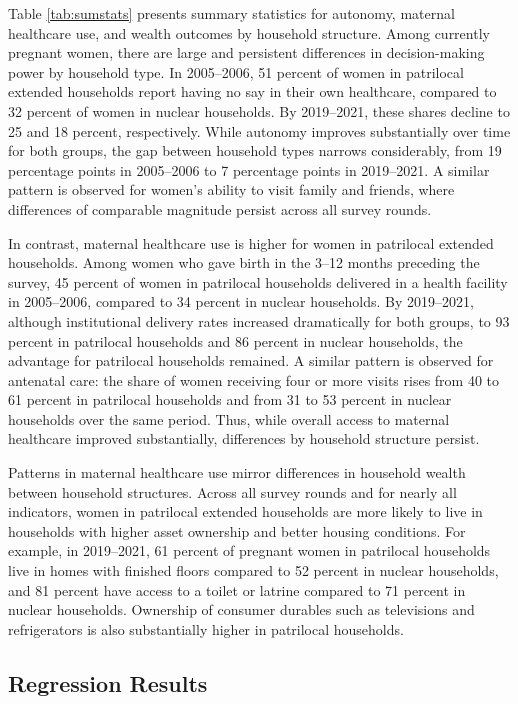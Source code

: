 \documentclass[12pt]{article}
\begin{document}
Table \ref{tab:sumstats} presents summary statistics for autonomy, maternal healthcare use, and wealth outcomes by household structure. Among currently pregnant women, there are large and persistent differences in decision-making power by household type. In 2005–2006, 51 percent of women in patrilocal extended households report having no say in their own healthcare, compared to 32 percent of women in nuclear households. By 2019–2021, these shares decline to 25 and 18 percent, respectively. While autonomy improves substantially over time for both groups, the gap between household types narrows considerably, from 19 percentage points in 2005–2006 to 7 percentage points in 2019–2021. A similar pattern is observed for women’s ability to visit family and friends, where differences of comparable magnitude persist across all survey rounds.

In contrast, maternal healthcare use is higher for women in patrilocal extended households. Among women who gave birth in the 3–12 months preceding the survey, 45 percent of women in patrilocal households delivered in a health facility in 2005–2006, compared to 34 percent in nuclear households. By 2019–2021, although institutional delivery rates increased dramatically for both groups, to 93 percent in patrilocal households and 86 percent in nuclear households, the advantage for patrilocal households remained. A similar pattern is observed for antenatal care: the share of women receiving four or more visits rises from 40 to 61 percent in patrilocal households and from 31 to 53 percent in nuclear households over the same period. Thus, while overall access to maternal healthcare improved substantially, differences by household structure persist.

Patterns in maternal healthcare use mirror differences in household wealth between household structures. Across all survey rounds and for nearly all indicators, women in patrilocal extended households are more likely to live in households with higher asset ownership and better housing conditions. For example, in 2019–2021, 61 percent of pregnant women in patrilocal households live in homes with finished floors compared to 52 percent in nuclear households, and 81 percent have access to a toilet or latrine compared to 71 percent in nuclear households. Ownership of consumer durables such as televisions and refrigerators is also substantially higher in patrilocal households.


\subsection{Regression Results}
\end{document}
